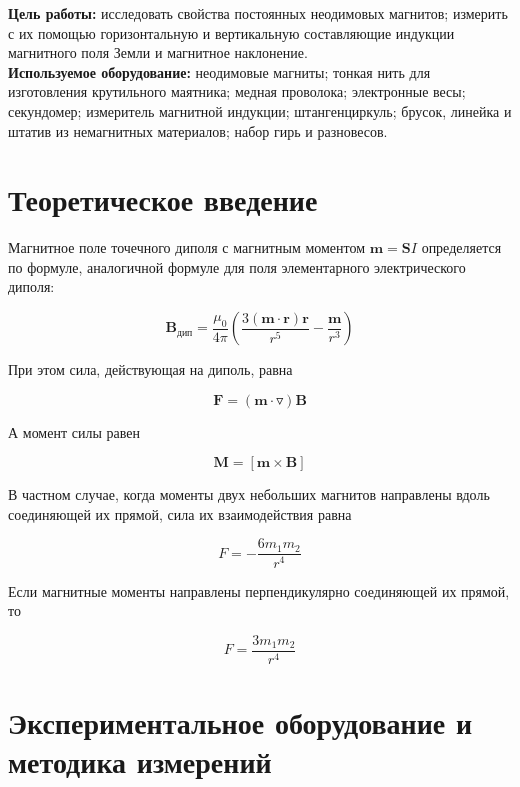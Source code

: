 \textbf{Цель работы:} исследовать свойства постоянных неодимовых магнитов; измерить с их помощью горизонтальную и вертикальную составляющие индукции магнитного поля Земли и магнитное наклонение. \\

\textbf{Используемое оборудование:} неодимовые магниты; тонкая нить для изготовления крутильного маятника; медная проволока; электронные весы; секундомер; измеритель магнитной индукции; штангенциркуль; брусок, линейка и штатив из немагнитных материалов; набор гирь и разновесов. 
                    
\section{Теоретическое введение}

Магнитное поле точечного диполя с магнитным моментом $\textbf{m} = \textbf{S}I$ определяется по формуле, аналогичной формуле для поля элементарного электрического диполя:

\begin{equation}
    \textbf{B}_{\text{дип}} = \frac{\mu_0}{4 \pi} \left( \frac{3(\textbf{m} \cdot \textbf{r})\textbf{r}}{r^5} - \frac{\textbf{m}}{r^3}  \right)
\end{equation}

При этом сила, действующая на диполь, равна 

\begin{equation}
    \textbf{F} = (\textbf{m} \cdot \triangledown ) \textbf{B}
\end{equation}

А момент силы равен

\begin{equation}
    \textbf{M} = [ \textbf{m} \times \textbf{B}] 
\end{equation}

В частном случае, когда моменты двух небольших магнитов направлены вдоль соединяющей их прямой, сила их взаимодействия равна

\begin{equation}
    F = - \frac{6 m_1 m_2}{r^4}
\end{equation}

Если магнитные моменты направлены перпендикулярно соединяющей их прямой, то

\begin{equation}
    F = \frac{3 m_1 m_2}{r^4}
\end{equation}

\section{Экспериментальное оборудование и методика измерений}

